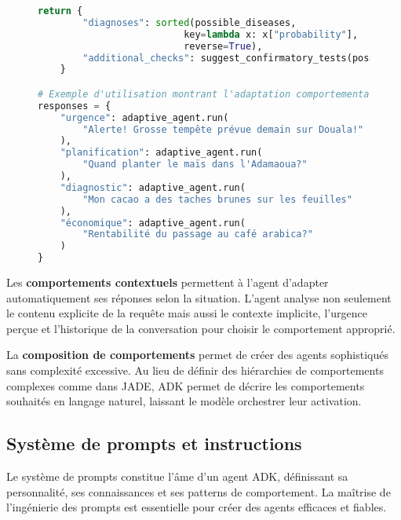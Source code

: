 \begin{figure}[h]
\begin{lstlisting}[language=Python, caption=Comportements adaptatifs avec ADK]
    return {
        "diagnoses": sorted(possible_diseases,
                          key=lambda x: x["probability"],
                          reverse=True),
        "additional_checks": suggest_confirmatory_tests(possible_diseases)
    }

# Exemple d'utilisation montrant l'adaptation comportementale
responses = {
    "urgence": adaptive_agent.run(
        "Alerte! Grosse tempête prévue demain sur Douala!"
    ),
    "planification": adaptive_agent.run(
        "Quand planter le maïs dans l'Adamaoua?"
    ),
    "diagnostic": adaptive_agent.run(
        "Mon cacao a des taches brunes sur les feuilles"
    ),
    "économique": adaptive_agent.run(
        "Rentabilité du passage au café arabica?"
    )
}
\end{lstlisting}
\end{figure}

Les \textbf{comportements contextuels} permettent à l'agent d'adapter automatiquement ses réponses selon la situation. L'agent analyse non seulement le contenu explicite de la requête mais aussi le contexte implicite, l'urgence perçue et l'historique de la conversation pour choisir le comportement approprié.

La \textbf{composition de comportements} permet de créer des agents sophistiqués sans complexité excessive. Au lieu de définir des hiérarchies de comportements complexes comme dans JADE, ADK permet de décrire les comportements souhaités en langage naturel, laissant le modèle orchestrer leur activation.

\subsection{Système de prompts et instructions}

Le système de prompts constitue l'âme d'un agent ADK, définissant sa personnalité, ses connaissances et ses patterns de comportement. La maîtrise de l'ingénierie des prompts est essentielle pour créer des agents efficaces et fiables.

